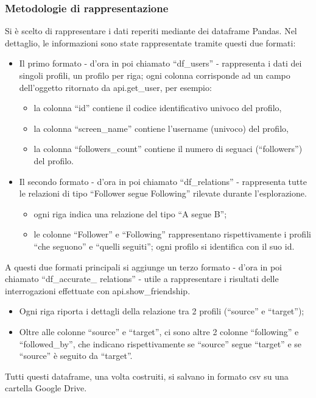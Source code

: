 \documentclass[a4paper, 12pt, twoside]{article}
\begin{document}
\subsubsection{Metodologie di rappresentazione}
Si è scelto di rappresentare i dati reperiti mediante dei dataframe Pandas. 
Nel dettaglio, le informazioni sono state rappresentate tramite questi due formati:
\begin{itemize}
    \item Il primo formato - d’ora in poi chiamato “df\_users” - rappresenta i dati dei singoli profili, un profilo per riga; ogni colonna corrisponde ad un campo dell’oggetto ritornato da api.get\_user, per esempio:
    \begin{itemize}
        \item la colonna “id” contiene il codice identificativo univoco del profilo,
        \item la colonna “screen\_name” contiene l’username (univoco) del profilo,
        \item la colonna “followers\_count” contiene il numero di seguaci (“followers”) del profilo.
    \end{itemize}
    \item Il secondo formato - d’ora in poi chiamato “df\_relations” - rappresenta tutte le relazioni di tipo “Follower segue Following” rilevate durante l’esplorazione.
    \begin{itemize}
        \item ogni riga indica una relazione del tipo “A segue B”;
        \item le colonne “Follower” e “Following” rappresentano rispettivamente i profili “che seguono” e “quelli seguiti”; ogni profilo si identifica con il suo id.
    \end{itemize}
\end{itemize}
A questi due formati principali si aggiunge un terzo formato - d’ora in poi chiamato “df\_accurate\_ relations” - utile a rappresentare i risultati delle interrogazioni effettuate con api.show\_friendship.
\begin{itemize}
    \item Ogni riga riporta i dettagli della relazione tra 2 profili (“source” e “target”);
    \item Oltre alle colonne “source” e “target”, ci sono altre 2 colonne “following” e “followed\_by”, che indicano  rispettivamente se “source” segue “target” e se “source” è seguito da “target”.
\end{itemize}
Tutti questi dataframe, una volta costruiti, si salvano in formato csv su una cartella Google Drive.
\end{document}
